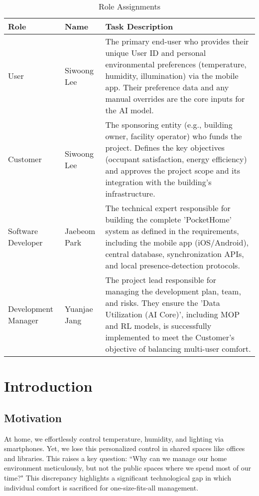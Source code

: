 \documentclass[conference]{IEEEtran}
\begin{document}
\begin{table}[H]
\caption{Role Assignments}
\label{tab:roles}
\centering
\begin{tabularx}{\columnwidth}{l l X}
\toprule
\textbf{Role} & \textbf{Name} & \textbf{Task Description} \\
\midrule
User & Siwoong Lee & The primary end-user who provides their unique User ID and personal environmental preferences (temperature, humidity, illumination) via the mobile app. Their preference data and any manual overrides are the core inputs for the AI model. \\
\addlinespace
Customer & Siwoong Lee & The sponsoring entity (e.g., building owner, facility operator) who funds the project. Defines the key objectives (occupant satisfaction, energy efficiency) and approves the project scope and its integration with the building's infrastructure. \\
\addlinespace
Software Developer & Jaebeom Park & The technical expert responsible for building the complete 'PocketHome' system as defined in the requirements, including the mobile app (iOS/Android), central database, synchronization APIs, and local presence-detection protocols. \\
\addlinespace
Development Manager & Yuanjae Jang & The project lead responsible for managing the development plan, team, and risks. They ensure the 'Data Utilization (AI Core)', including MOP and RL models, is successfully implemented to meet the Customer's objective of balancing multi-user comfort. \\
\bottomrule
\end{tabularx}
\end{table}


\section{Introduction}

\subsection{Motivation}
At home, we effortlessly control temperature, humidity, and lighting via smartphones. Yet, we lose this personalized control in shared spaces like offices and libraries. This raises a key question: ``Why can we manage our home environment meticulously, but not the public spaces where we spend most of our time?" This discrepancy highlights a significant technological gap in which individual comfort is sacrificed for one-size-fits-all management.
\end{document}
